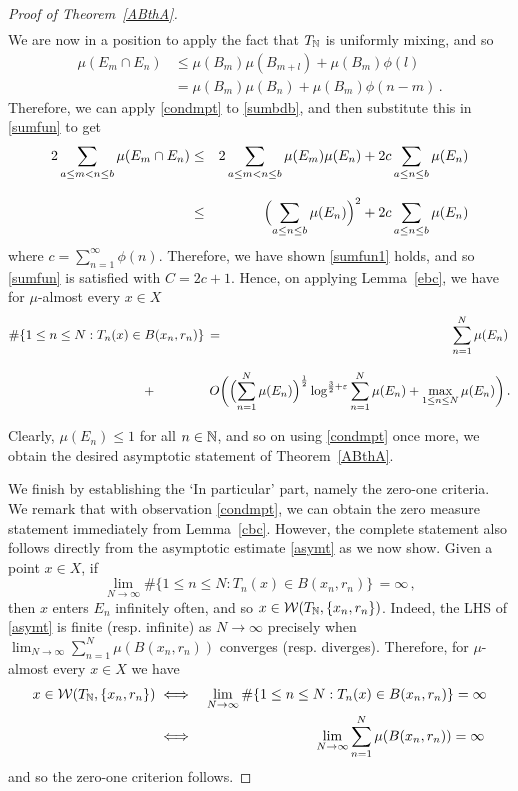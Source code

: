 \documentclass[11pt,reqno]{amsart}
\newcommand{\N}{{\Bbb N}}
\newcommand{\0}{\mathbf{0}}
\theoremstyle{remark}
\numberwithin{equation}{section}
\theoremstyle{remark}
\numberwithin{equation}{section}
\begin{document}
\begin{proof}[Proof of Theorem~\ref{ABthA}]
\begin{eqnarray*}
\end{eqnarray*}
We are now in a position to apply the fact that $T_\N$ is uniformly mixing, and so
\begin{equation} \label{sumbdb}
\begin{split}\mu(E_m \cap E_n) &\leq \mu(B_m) \mu(B_{m+l}) + \mu(B_m)\phi(l) \\[2ex]&=  \mu(B_m) \mu(B_{n}) + \mu(B_m)\phi(n-m) \, .
\end{split}
\end{equation}
Therefore, we can apply \eqref{condmpt} to \eqref{sumbdb}, and then substitute this in \eqref{sumfun} to get
\begin{eqnarray*}
    2\sum_{a \leq m < n \leq b}\mu(E_m \cap E_n)   &\leq & 
    2\sum_{a \leq m < n \leq b} \mu(E_m) \mu(E_n) + 2c \sum_{a \leq n \leq b} \mu(E_n) \\[2ex] & \leq & \Bigl(\sum_{a \leq n \leq b}\mu(E_n)\Bigr )^2 + 2c \sum_{a \leq n \leq b} \mu(E_n) 
\end{eqnarray*}
where $c = \sum\limits_{n=1}^\infty \phi(n)$. Therefore, we have shown \eqref{sumfun1} holds, and so \eqref{sumfun} is satisfied with $C= 2c+1$.
 Hence, on applying Lemma~\ref{ebc}, we have for $\mu$-almost every $x \in X$
\begin{eqnarray*}
\#\{1\leq n \leq N: T_n(x) \in B(x_n,r_n)  \}\, &=&\, \sum_{n=1}^{N} \mu(E_n) \, \\[2ex] & ~ \hspace*{-12ex} +\,&    ~ \hspace*{-5ex} O\biggl(\Bigl(\sum_{n=1}^{N} \mu(E_n)\Bigr)^{\frac{1}{2}}\log^{\frac{3}{2}+\varepsilon}\sum_{n=1}^{N} \mu(E_n) + \max_{1 \leq n \leq N}{\mu(E_n)} \biggr ) \, .
\end{eqnarray*}

\noindent Clearly, $\mu(E_n) \leq 1$ for all $n \in \N$, and so on using  \eqref{condmpt} once more, we obtain the desired asymptotic statement of Theorem~\ref{ABthA}. 




We finish by establishing the `In particular' part, namely the zero-one criteria. We remark that with observation \eqref{condmpt}, we can obtain the zero measure statement immediately from Lemma~\ref{cbc}. However, the complete statement also follows directly from the asymptotic estimate \eqref{asymt} as we now show. 
Given a point $x \in X$, if
$$\lim_{N \to \infty}\#\{1\leq n \leq N: T_n(x) \in B(x_n,r_n)  \}\, = \infty \, ,$$ 
then  $x$ enters $E_n$ infinitely often, and so $x \in \mathcal{W}(T_\N,\{x_n, r_n\})$. 
Indeed, the LHS of \eqref{asymt} is finite (resp. infinite) as $N \to \infty$ precisely when $\lim_{N \to \infty}\sum_{n=1}^N \mu(B(x_n,r_n))$ converges (resp. diverges). Therefore, for $\mu$-almost every $x \in X$ we have
\begin{eqnarray*}
x \in \mathcal{W}(T_\N,\{x_n, r_n\}) & \iff & \lim_{N \to \infty}\#\{1\leq n \leq N: T_n(x) \in B(x_n,r_n)  \} = \infty  \\ &\iff& \lim_{N \to \infty}\sum_{n=1}^N \mu(B(x_n,r_n)) = \infty\, 
\end{eqnarray*}
and so the zero-one criterion follows.
\end{proof}
\medskip
\end{document}
